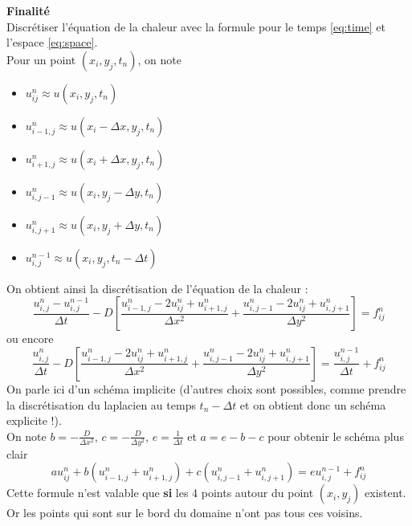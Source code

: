 \documentclass[11pt,a4paper]{article}
\newcommand{\dx}{\Delta x}
\newcommand{\dy}{\Delta y}
\newcommand{\dt}{\Delta t}
\begin{document}
\noindent \textbf{Finalité}\\
Discrétiser l'équation de la chaleur avec la formule pour le temps \eqref{eq:time} et l'espace \eqref{eq:space}.\\
\noindent Pour un point $(x_i, y_j, t_n)$, on note\\
\begin{itemize}
    \item $u_{ij}^n \approx u(x_i, y_j, t_n)$
    \item $u_{i-1, j}^n \approx u(x_i - \dx, y_j, t_n)$
    \item $u_{i+1, j}^n \approx u(x_i + \dx, y_j, t_n)$
    \item $u_{i, j-1}^n \approx u(x_i, y_j - \dy, t_n)$
    \item $u_{i, j+1}^n \approx u(x_i , y_j + \dy, t_n)$
    \item $u_{i, j}^{n-1} \approx u(x_i, y_j, t_n - \dt)$
\end{itemize}
\noindent On obtient ainsi la discrétisation de l'équation de la chaleur :
\begin{equation}
    \frac{u_{i, j}^{n} - u_{i, j}^{n-1}}{\dt} - D\left[\frac{u_{i-1, j}^n - 2u_{ij}^n + u_{i+1, j}^n}{\dx^2} + \frac{u_{i, j-1}^n - 2u_{ij}^n + u_{i, j+1}^n}{\dy^2}\right] = f_{ij}^n
\end{equation}
ou encore
\begin{equation}
    \frac{u_{i, j}^{n}}{\dt} - D\left[\frac{u_{i-1, j}^n - 2u_{ij}^n + u_{i+1, j}^n}{\dx^2} + \frac{u_{i, j-1}^n - 2u_{ij}^n + u_{i, j+1}^n}{\dy^2}\right] = \frac{u_{i, j}^{n-1}}{\dt}  + f_{ij}^n
\end{equation}
On parle ici d'un schéma implicite (d'autres choix sont possibles, comme prendre la discrétisation du laplacien au temps $t_n - \dt$ et on obtient donc un schéma explicite !).\\
\noindent On note $b = -\frac{D}{\dx^2}$, $c = -\frac{D}{\dy^2}$, $e = \frac{1}{\dt}$ et $a = e - b- c$ pour obtenir le schéma plus clair
\begin{equation}
    au_{ij}^n + b\left(u_{i-1, j}^n + u_{i+1, j}^n\right) +  c\left(u_{i, j-1}^n + u_{i, j+1}^n\right) = e u_{i, j}^{n-1} + f_{ij}^n
\end{equation}
Cette formule n'est valable que \textbf{si} les 4 points autour du point $(x_i, y_j)$ existent. Or les points qui sont sur le bord du domaine n'ont pas tous ces voisins.\\
\end{document}
